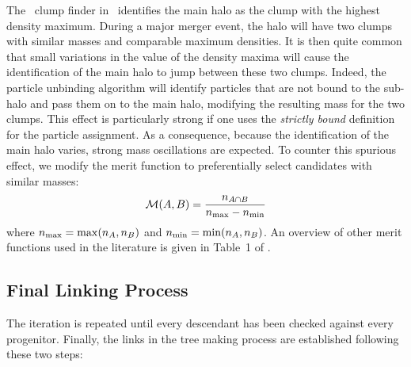 The \phew\ clump finder in \ramses\ identifies the main halo as the
clump with the highest density maximum.  During a major merger event,
the halo will have two clumps with similar masses and comparable
maximum densities.  It is then quite common that small variations in
the value of the density maxima will cause the identification of the
main halo to jump between these two clumps.  Indeed, the particle
unbinding algorithm will identify particles that are not bound to the
sub-halo and pass them on to the main halo, modifying the resulting
mass for the two clumps.  This effect is particularly strong if one
uses the {\it strictly bound} definition for the particle
assignment. As a consequence, because the identification of the main
halo varies, strong mass oscillations are expected. To counter this
spurious effect, we modify the merit function to preferentially select candidates with
similar masses:
\begin{equation}
\mathcal{M}(A,B) = \frac{n_{A \cap B}}{n_{\rm max} - n_{\rm min}} \label{eq:merit}
\end{equation}
where $n_{\rm max}=\max(n_A,n_B)$ and $n_{\rm min}=\min(n_A,n_B)$.  An
overview of other merit functions used in the literature is given in
Table~1 of \cite{SUSSING_COMPARISON}.

\subsection{Final Linking Process}

The iteration is repeated until every descendant has been checked
against every progenitor. Finally, the links in the tree making
process are established following these two steps:

